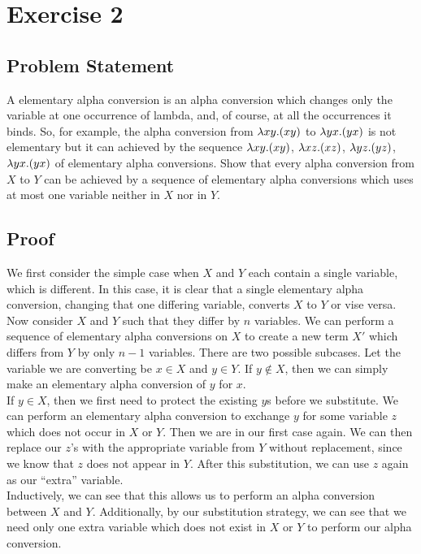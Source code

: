 \chapter{Exercise 2}
\lhead{\today}

\section{Problem Statement}
A elementary alpha conversion is an alpha conversion which changes only the variable at one occurrence of lambda, and, of course, at all the occurrences it binds. So, for example, the alpha conversion from $\lambda xy.(xy)$ to $\lambda yx. (yx)$ is not elementary but it can achieved by the sequence $\lambda xy.(xy)$, $\lambda xz.(xz)$, $\lambda yz.(yz)$, $\lambda yx.(yx)$ of elementary alpha conversions. Show that every alpha conversion from $X$ to $Y$ can be achieved by a sequence of elementary alpha conversions which uses at most one variable neither in $X$ nor in $Y$.

\section{Proof}
We first consider the simple case when $X$ and $Y$ each contain a single variable, which is different. In this case, it is clear that a single elementary alpha conversion, changing that one differing variable, converts $X$ to $Y$ or vise versa.\\

Now consider $X$ and $Y$ such that they differ by $n$ variables. We can perform a sequence of elementary alpha conversions on $X$ to create a new term $X'$ which differs from $Y$ by only $n - 1$ variables. There are two possible subcases. Let the variable we are converting be $x \in X$ and $y \in Y$. If $y \not\in X$, then we can simply make an elementary alpha conversion of $y$ for $x$.\\

If $y \in X$, then we first need to protect the existing $y$s before we substitute. We can perform an elementary alpha conversion to exchange $y$ for some variable $z$ which does not occur in $X$ or $Y$. Then we are in our first case again. We can then replace our $z$'s with the appropriate variable from $Y$ without replacement, since we know that $z$ does not appear in $Y$. After this substitution, we can use $z$ again as our ``extra'' variable.\\

Inductively, we can see that this allows us to perform an alpha conversion between $X$ and $Y$. Additionally, by our substitution strategy, we can see that we need only one extra variable which does not exist in $X$ or $Y$ to perform our alpha conversion. \qqed